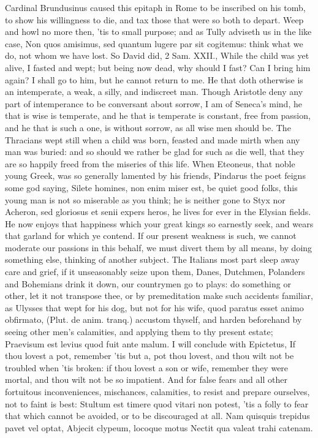 {Cardinal Brundusinus caused this epitaph in Rome to be inscribed
on his tomb, to show his willingness to die, and tax those that were so
both to depart. Weep and howl no more then, 'tis to small purpose; and
as Tully adviseth us in the like case, Non quos amisimus, sed quantum
lugere par sit cogitemus: think what we do, not whom we have lost. So
David did, 2 Sam. XXII., While the child was yet alive, I fasted and
wept; but being now dead, why should I fast? Can I bring him again? I
shall go to him, but he cannot return to me. He that doth otherwise is
an intemperate, a weak, a silly, and indiscreet man. Though Aristotle
deny any part of intemperance to be conversant about sorrow, I am of
Seneca's mind, he that is wise is temperate, and he that is
temperate is constant, free from passion, and he that is such a one, is
without sorrow, as all wise men should be. The Thracians wept
still when a child was born, feasted and made mirth when any man was
buried: and so should we rather be glad for such as die well, that they
are so happily freed from the miseries of this life. When Eteoneus,
that noble young Greek, was so generally lamented by his friends,
Pindarus the poet feigns some god saying, Silete homines, non enim
miser est, \etc{} be quiet good folks, this young man is not so miserable
as you think; he is neither gone to Styx nor Acheron, sed gloriosus et
senii expers heros, he lives for ever in the Elysian fields. He now
enjoys that happiness which your great kings so earnestly seek, and
wears that garland for which ye contend. If our present weakness is
such, we cannot moderate our passions in this behalf, we must divert
them by all means, by doing something else, thinking of another
subject. The Italians most part sleep away care and grief, if it
unseasonably seize upon them, Danes, Dutchmen, Polanders and Bohemians
drink it down, our countrymen go to plays: do something or other, let
it not transpose thee, or by  premeditation make such accidents
familiar, as Ulysses that wept for his dog, but not for his wife, quod
paratus esset animo obfirmato, (Plut. de anim. tranq.) accustom
thyself, and harden beforehand by seeing other men's calamities, and
applying them to thy present estate; Praevisum est levius quod fuit
ante malum. I will conclude with Epictetus, If thou lovest a pot,
remember 'tis but a, pot thou lovest, and thou wilt not be troubled
when 'tis broken: if thou lovest a son or wife, remember they were
mortal, and thou wilt not be so impatient. And for false fears and all
other fortuitous inconveniences, mischances, calamities, to resist and
prepare ourselves, not to faint is best: Stultum est timere quod
vitari non potest, 'tis a folly to fear that which cannot be avoided,
or to be discouraged at all.
Nam quisquis trepidus pavet vel optat,
Abjecit clypeum, locoque motus
Nectit qua valeat trahi catenam.

}
